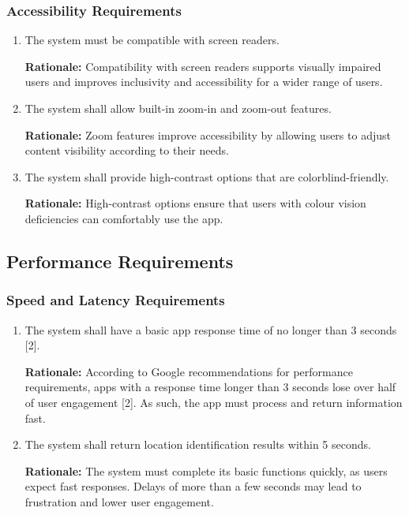 \documentclass[]{article}
\begin{document}
\subsubsection{Accessibility Requirements}
\label{ssub:accessibility_requirements}
\begin{enumerate}[{UH-A}1. ]
	\item The system must be compatible with screen readers.
		
	{\bf Rationale:} Compatibility with screen readers supports visually impaired users and improves inclusivity and accessibility for a wider range of users.
	\item The system shall allow built-in zoom-in and zoom-out features.
		
	{\bf Rationale:} Zoom features improve accessibility by allowing users to adjust content visibility according to their needs.
	\item The system shall provide high-contrast options that are colorblind-friendly.
	
	{\bf Rationale:} High-contrast options ensure that users with colour vision deficiencies can comfortably use the app.
\end{enumerate}


\subsection{Performance Requirements}
\label{sub:performance_requirements}

\subsubsection{Speed and Latency Requirements}
\label{ssub:speed_and_latency_requirements}
\begin{enumerate}[{PR-SL}1. ]
	\item The system shall have a basic app response time of no longer than 3 seconds [2].
		
	{\bf Rationale:} According to Google recommendations for performance requirements, apps with a response time longer than 3 seconds lose over half of user engagement [2]. As such, the app must process and return information fast.
	\item The system shall return location identification results within 5 seconds.
	
	{\bf Rationale:} The system must complete its basic functions quickly, as users expect fast responses. Delays of more than a few seconds may lead to frustration and lower user engagement.
\end{enumerate}
\end{document}
